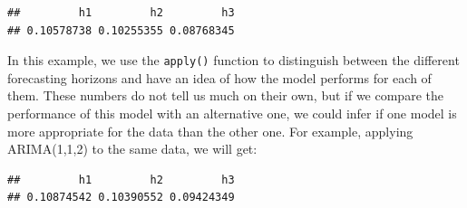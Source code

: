 \documentclass[
]{book}
\newenvironment{Shaded}{\begin{snugshade}}{\end{snugshade}}
\newcommand{\AttributeTok}[1]{\textcolor[rgb]{0.77,0.63,0.00}{#1}}
\newcommand{\ConstantTok}[1]{\textcolor[rgb]{0.00,0.00,0.00}{#1}}
\newcommand{\DecValTok}[1]{\textcolor[rgb]{0.00,0.00,0.81}{#1}}
\newcommand{\FunctionTok}[1]{\textcolor[rgb]{0.00,0.00,0.00}{#1}}
\newcommand{\NormalTok}[1]{#1}
\newcommand{\OtherTok}[1]{\textcolor[rgb]{0.56,0.35,0.01}{#1}}
\newcommand{\SpecialCharTok}[1]{\textcolor[rgb]{0.00,0.00,0.00}{#1}}
\newcommand{\StringTok}[1]{\textcolor[rgb]{0.31,0.60,0.02}{#1}}
\theoremstyle{definition}
\theoremstyle{definition}
\theoremstyle{definition}
\theoremstyle{definition}
\theoremstyle{remark}
\begin{document}
\begin{Shaded}
\end{Shaded}

\begin{verbatim}
##         h1         h2         h3 
## 0.10578738 0.10255355 0.08768345
\end{verbatim}

In this example, we use the \texttt{apply()} function to distinguish between the different forecasting horizons and have an idea of how the model performs for each of them. These numbers do not tell us much on their own, but if we compare the performance of this model with an alternative one, we could infer if one model is more appropriate for the data than the other one. For example, applying ARIMA(1,1,2) to the same data, we will get:

\begin{Shaded}
\end{Shaded}

\begin{verbatim}
##         h1         h2         h3 
## 0.10874542 0.10390552 0.09424349
\end{verbatim}
\end{document}
